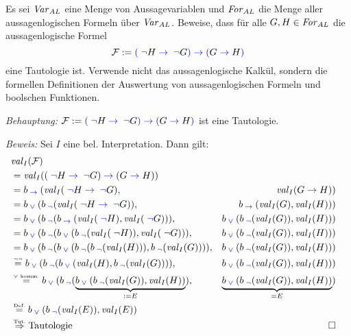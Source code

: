 \documentclass[a4paper]{article}
\begin{document}
Es sei $\hbox{\textit{Var}}_{AL}$ eine Menge von Aussagevariablen und $\hbox{\textit{For}}_{AL}$ die Menge aller aussagenlogischen Formeln über $\hbox{\textit{Var}}_{AL}$. Beweise, dass für alle \(G, H \in \hbox{\textit{For}}_{AL}\) die aussagenlogische Formel
				\[\mathcal{F} :=	\textcolor{blue}{(}\text{}{} \text{\;}\textcolor{blue}{\neg}\text{}{} H\text{\;}\textcolor{blue}{\to}\text{\;}{} \text{\;}\textcolor{blue}{\neg}\text{}{} G \textcolor{blue}{)}\text{}{} \text{\;}\textcolor{blue}{\to}\text{\;}{} \textcolor{blue}{(}\text{}{} G \text{\;}\textcolor{blue}{\to}\text{\;}{} H \textcolor{blue}{)}\text{}{}\]
		eine Tautologie ist. Verwende nicht das aussagenlogische Kalkül, sondern die formellen Definitionen der Auswertung von aussagenlogischen Formeln und boolschen Funktionen.

\emph{Behauptung:} \(\mathcal{F} :=	\textcolor{blue}{(}\text{}{} \text{\;}\textcolor{blue}{\neg}\text{}{} H\text{\;}\textcolor{blue}{\to}\text{\;}{} \text{\;}\textcolor{blue}{\neg}\text{}{} G \textcolor{blue}{)}\text{}{} \text{\;}\textcolor{blue}{\to}\text{\;}{} \textcolor{blue}{(}\text{}{} G \text{\;}\textcolor{blue}{\to}\text{\;}{} H \textcolor{blue}{)}\text{}{}\) ist eine Tautologie.

\emph{Beweis:} Sei $I$ eine bel. Interpretation. Dann gilt:
\begin{align*}
	&\vali{\mathcal{F}}&\\
	&=\vali{(\bnot{} H \bimp{} \bnot{} G) \bimp{} (G \bimp{} H)}&\\
	&=\bfimp{\vali{\bnot{} H \bimp{} \bnot{} G}}{&\vali{G\bimp{} H}}&\\
	&=\bfor{\bfnot{\vali{\bnot{} H \bimp{} \bnot{} G}}}%
		{&\bfimp{\vali{G}}{\vali{H}}}&\\
	&=\bfor{\bfnot{\bfimp{\vali{\bnot{} H}}{\vali{\bnot{} G}}}}%
		{&\bfor{\bfnot{\vali{G}}}{\vali{H}}}&\\
	&=\bfor{\bfnot{\bfor{\bfnot{\vali{\bnot H}}}{\vali{\bnot G}}}}%
	{&\bfor{\bfnot{\vali{G}}}{\vali{H}}}&\\
	&=\bfor{\bfnot{\bfor{\bfnot{\bfnot{\vali{H}}}}{\bfnot{\vali{G}}}}}%
	{&\bfor{\bfnot{\vali{G}}}{\vali{H}}}&\\
	&\eqtext{$\neg\neg$}%
	\bfor{\bfnot{\bfor{\vali{H}}{\bfnot{\vali{G}}}}}{&\bfor{\bfnot{\vali{G}}}{\vali{H}}}&\\
	&\eqtext{$\vee$ komm.}%
	\bfor{\bfnot{\underbrace{{\bfor{\bfnot{\vali{G}}}{\vali{H}}}}_{:=E}}}{&\underbrace{{\bfor{\bfnot{\vali{G}}}{\vali{H}}}}_{=E}}&\\
	&\eqtext{Def.} \bfor{\bfnot{\vali{E}}}{\vali{E}}\\
	&\imptext{Tut.} \text{Tautologie} & \qedwhite{}
\end{align*}
\end{document}
